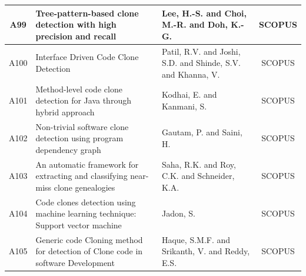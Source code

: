 \begin{table}[ht]
{\begin{tabular}{cllc}
			A99  & Tree-pattern-based clone detection with high precision and recall                                                                              & Lee, H.-S. and Choi, M.-R. and Doh, K.-G.                                                                                  & SCOPUS                                                    \\\hline 
			A100 & Interface Driven Code Clone Detection                                                                                                          & Patil, R.V. and Joshi, S.D. and Shinde, S.V. and Khanna, V.                                                                & SCOPUS                                                    \\\hline 
			A101 & Method-level code clone detection for Java through hybrid approach                                                                             & Kodhai, E. and Kanmani, S.                                                                                                 & SCOPUS                                                    \\\hline 
			A102 & Non-trivial software clone detection using program dependency graph                                                                            & Gautam, P. and Saini, H.                                                                                                   & SCOPUS                                                    \\\hline 
			A103 & An automatic framework for extracting and classifying near-miss clone genealogies                                                              & Saha, R.K. and Roy, C.K. and Schneider, K.A.                                                                               & SCOPUS                                                    \\\hline 
			A104 & Code clones detection using machine learning technique: Support vector machine                                                                 & Jadon, S.                                                                                                                  & SCOPUS                                                    \\\hline 
			A105 & Generic code Cloning method for detection of Clone code in software Development                                                                & Haque, S.M.F. and Srikanth, V. and Reddy, E.S.                                                                             & SCOPUS                                                    \\\hline 

\end{tabular}}
\end{table}
